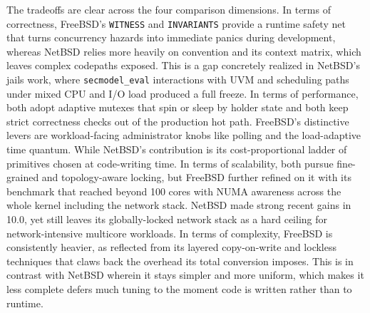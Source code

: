 The tradeoffs are clear across the four comparison dimensions. In terms of correctness, FreeBSD's \texttt{WITNESS}
and \texttt{INVARIANTS} provide a runtime safety net that turns concurrency hazards into immediate panics during
development, whereas NetBSD relies more heavily on convention and its context matrix, which leaves complex
codepaths exposed. This is a gap concretely realized in NetBSD's jails work, where \texttt{secmodel\_eval} interactions
with UVM and scheduling paths under mixed CPU and I/O load produced a full freeze. In terms of performance, both adopt
adaptive mutexes that spin or sleep by holder state and both keep strict correctness checks out of the production hot
path. FreeBSD's distinctive levers are workload-facing administrator knobs like polling and the load-adaptive time
quantum. While NetBSD's contribution is its cost-proportional ladder of primitives chosen at code-writing time. In
terms of scalability, both pursue fine-grained and topology-aware locking, but FreeBSD further refined on it
with its benchmark that reached beyond 100 cores with NUMA awareness across the whole kernel including the network stack.
NetBSD made strong recent gains in 10.0, yet still leaves its globally-locked network stack as a hard ceiling for
network-intensive multicore workloads. In terms of complexity, FreeBSD is consistently heavier, as reflected
from its layered copy-on-write and lockless techniques that claws back the overhead its total conversion imposes.
This is in contrast with NetBSD wherein it stays simpler and more uniform, which makes it less complete defers
much tuning to the moment code is written rather than to runtime.

